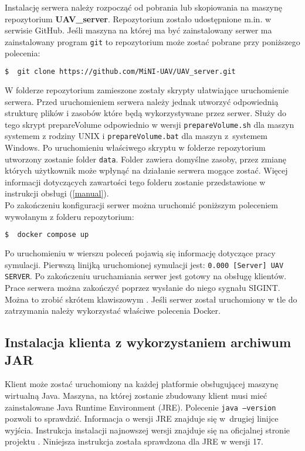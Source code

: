 Instalację serwera należy rozpocząć od pobrania lub skopiowania na maszynę repozytorium \textbf{UAV\_server}. Repozytorium zostało udostępnione m.in. w serwisie GitHub. Jeśli maszyna na której ma być zainstalowany serwer ma zainstalowany program \texttt{git} to repozytorium może zostać pobrane przy poniższego polecenia:
\begin{lstlisting}[language=bash]
  $  git clone https://github.com/MiNI-UAV/UAV_server.git
\end{lstlisting}

W folderze repozytorium zamieszone zostały skrypty ułatwiające uruchomienie serwera. Przed uruchomieniem serwera należy jednak utworzyć odpowiednią strukturę plików i zasobów które będą wykorzystywane przez serwer. Służy do tego skrypt prepareVolume odpowiednio w wersji  \texttt{prepareVolume.sh} dla maszyn systemem z rodziny UNIX i  \texttt{prepareVolume.bat} dla maszyn z~systemem Windows. Po uruchomieniu właściwego skryptu w folderze repozytorium utworzony zostanie folder \texttt{data}. Folder zawiera domyślne zasoby, przez zmianę których użytkownik może wpłynąć na działanie serwera mogące zostać.  Więcej informacji dotyczących zawartości tego folderu zostanie przedstawione w instrukcji obsługi (\ref{manual}).\\

Po zakończeniu konfiguracji serwer można uruchomić poniższym poleceniem wywołanym z folderu repozytorium:
\begin{lstlisting}[language=bash]
  $  docker compose up
\end{lstlisting}
Po uruchomieniu w wierszu poleceń pojawią się informację dotyczące pracy symulacji. Pierwszą linijką uruchomionej symulacji jest: \texttt{0.000 [Server] UAV SERVER}. Po zakończeniu uruchamiania serwer jest gotowy na obsługę klientów.\\

Prace serwera można zakończyć poprzez wysłanie do niego sygnału SIGINT. Można to zrobić skrótem klawiszowym . Jeśli serwer został uruchomiony w tle do zatrzymania należy wykorzystać właściwe polecenia Docker.

\subsection{Instalacja klienta z wykorzystaniem archiwum JAR}
\label{javaInst}

Klient może zostać uruchomiony na każdej platformie obsługującej maszynę wirtualną Java. 
Maszyna, na której zostanie zbudowany klient musi mieć zainstalowane Java Runtime Environment (JRE). Polecenie \texttt{java --version} pozwoli to sprawdzić. Informacja o wersji JRE znajduje się w~drugiej linijce wyjścia. Instrukcja instalacji najnowszej wersji znajduje się na oficjalnej stronie projektu \cite{java}. Niniejsza instrukcja została sprawdzona dla JRE w wersji 17. \\


